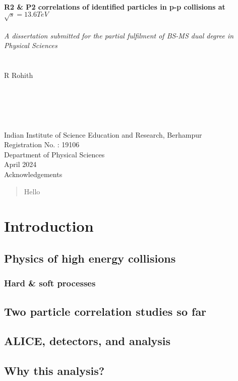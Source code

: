 \documentclass[12pt,a4paper,twoside]{article}
\newcommand{\firstpagemargin}{\setlength{\headsep}{115pt}\setlength{\textheight}{610pt}}
\newcommand{\usersetfontsize}[2]{\fontsize{#1}{#2}\selectfont}
\begin{document}
\firstpagemargin
{
\centering
~\\~\\~\\
\textbf{\fontsize{16pt}{24pt}\selectfont R2 \& P2 correlations of identified particles in p-p collisions at $\sqrt{s}=13.6 TeV$}\\~\\%
\textit{A dissertation submitted for the partial fulfilment of BS-MS dual degree in Physical Sciences}\\~\\~\\%
{R Rohith\\}%
~\\~\\~\\~\\~\\
{\usersetfontsize{14}{21}Indian Institute of Science Education and Research, Berhampur\\Registration No. : 19106\\Department of Physical Sciences\\}
{April 2024}\\
}
\newpage
{}
Acknowledgements
\newpage
\begin{abstract}
		Hello
\end{abstract}
\newpage
{}
\section{Introduction}\firstpagemargin
\subsection{Physics of high energy collisions}
\subsubsection{Hard \& soft processes}
\subsection{Two particle correlation studies so far}
\subsection{ALICE, detectors, and analysis}
\subsection{Why this analysis?}
\newpage
\end{document}
